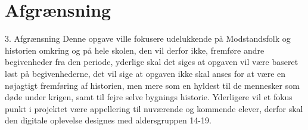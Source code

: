 \section{Afgrænsning}


3.	Afgrænsning
Denne opgave ville fokusere udelukkende på Modstandsfolk og historien omkring og på hele skolen, den vil derfor ikke, fremføre andre begivenheder fra den periode, yderlige skal det siges at opgaven vil være baseret løst på begivenhederne, det vil sige at opgaven ikke skal anses for at være en nøjagtigt fremføring af historien, men mere som en hyldest til de mennesker som døde under krigen, samt til fejre selve bygnings historie. Yderligere vil et fokus punkt i projektet være appellering til nuværende og kommende elever, derfor skal den digitale oplevelse designes med aldersgruppen 14-19.
